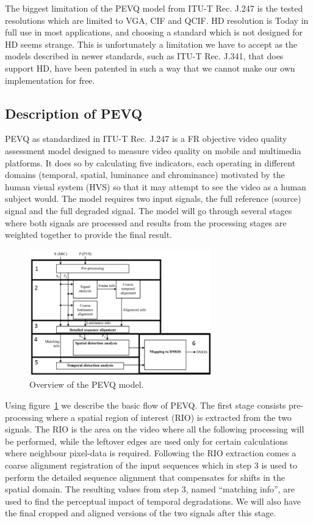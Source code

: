 The biggest limitation of the PEVQ model from ITU-T Rec. J.247 is the tested resolutions which are limited to VGA, CIF and QCIF. HD resolution is Today in full use in most applications, and choosing a standard which is not designed for HD seems strange. This is unfortunately a limitation we have to accept as the models described in newer standards, such as ITU-T Rec. J.341, that does support HD, have been patented in such a way that we cannot make our own implementation for free. 

\subsection{Description of PEVQ}\label{sect:pevq}
PEVQ as standardized in ITU-T Rec. J.247 is a FR objective video quality assessment model designed to measure video quality on mobile and multimedia platforms. It does so by calculating five indicators, each operating in different domains (temporal, spatial, luminance and chrominance) motivated by the human visual system (HVS) so that it may attempt to see the video as a human subject would. The model requires two input signals, the full reference (source) signal and the full degraded signal. The model will go through several stages where both signals are processed and results from the processing stages are weighted together to provide the final result.

\begin{figure}[h]
	  \centering
	\includegraphics[width=0.7\textwidth,natwidth=662,natheight=588]{images/pevqOverview.png}
	\caption{Overview of the PEVQ model.}
	\label{fig:pevqOverview}
\end{figure}
	  
Using figure~\ref{fig:pevqOverview} we describe the basic flow of PEVQ. The first stage consists pre-processing where a spatial region of interest (RIO) is extracted from the two signals. The RIO is the area on the video where all the following processing will be performed, while the leftover edges are used only for certain calculations where neighbour pixel-data is required. Following the RIO extraction comes a coarse alignment registration of the input sequences which in step 3 is used to perform the detailed sequence alignment that compensates for shifts in the spatial domain. The resulting values from step 3, named \enquote{matching info}, are used to find the perceptual impact of temporal degradations. We will also have the final cropped and aligned versions of the two signals after this stage.

